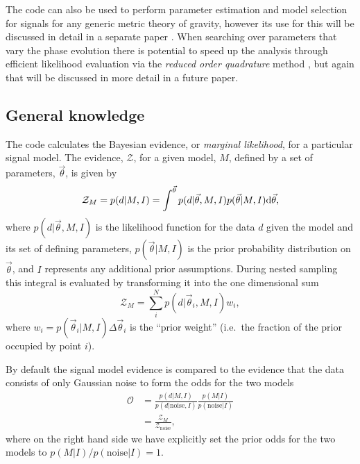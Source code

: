 The code can also be used to perform parameter estimation and model selection for signals for any generic
metric theory of gravity, however its use for this will be discussed in detail in a separate paper \citep{MaxCWpolariations}. When
searching over parameters that vary the phase evolution there is potential to speed up the analysis through
efficient likelihood evaluation via the {\it reduced order quadrature} method \citep[see, e.g.,][]{2014PhRvX...4c1006F,2015PhRvL.114g1104C},
but again that will be discussed in more detail in a future paper.

\subsection{General knowledge}\label{sec:general}

The code calculates the Bayesian evidence, or {\it marginal likelihood}, for a particular signal model. The
evidence, $\mathcal{Z}$, for a given model, $M$, defined by a set of parameters, $\vec{\theta}$, is given by
\begin{equation}\label{eq:evidence}
\mathcal{Z}_M = p(d|M,I) = \int^{\vec{\theta}} p(d|\vec{\theta},M,I)p(\vec{\theta}|M,I) {\rm d}\vec{\theta},
\end{equation}
where $p(d|\vec{\theta},M,I)$ is the likelihood function for the data $d$ given the
model and its set of defining parameters, $p(\vec{\theta}|M,I)$ is the prior probability distribution on
$\vec{\theta}$, and $I$ represents any additional prior assumptions. During nested sampling this integral is evaluated by transforming it into the one dimensional
sum
\begin{equation}\label{eq:nestedsampev}
\mathcal{Z}_M = \sum_i^N p(d|\vec{\theta}_i,M,I) w_i,
\end{equation}
where $w_i = p(\vec{\theta}_i|M,I) \Delta\vec{\theta}_i$ is the ``prior weight''
(i.e.\ the fraction of the prior occupied by point $i$).

By default the signal model evidence is compared to the evidence that the data consists of only Gaussian noise to form the odds for the two models
\begin{align}\label{eq:oddsratio}
\mathcal{O} &= \frac{p(d|M,I)}{p(d|\text{noise},I)}\frac{p(M|I)}{p(\text{noise}|I)} \nonumber \\
&= \frac{\mathcal{Z}_M}{\mathcal{Z}_{\text{noise}}},
\end{align}
where on the right hand side we have explicitly set the prior odds for the two models to
$p(M|I)/p(\text{noise}|I) = 1$.

